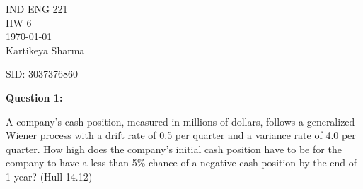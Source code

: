 \documentclass[12pt,letterpaper,onecolumn]{exam}
\begin{document}
\newenvironment{question}[1]{\noindent\textbf{#1}\par}{\par}


\begingroup  
    \centering
    \LARGE IND ENG 221\\
    \LARGE HW 6\\[0.5em]
    \large \today\\[0.5em]
    \large Kartikeya Sharma\par
    \large SID: 3037376860\par
\endgroup

\pointsdroppedatright
\printanswers
\renewcommand{\solutiontitle}{\noindent\textbf{Ans:}\enspace}

\begin{question}{Question 1:}
A company’s cash position, measured in millions of dollars, follows a generalized Wiener process with a drift rate of 0.5 per quarter and a variance rate of 4.0 per quarter. How high does the company’s initial cash position have to be for the company to have a less than 5\% chance of a negative cash position by the end of 1 year? (Hull 14.12)
\end{question}
\end{document}
